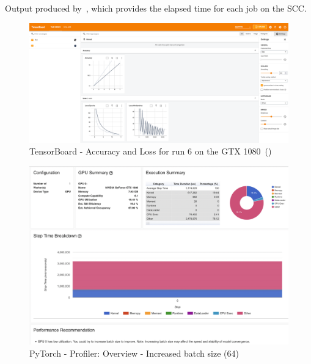 \documentclass[12pt, a4paper, hidelinks]{article}
\begin{document}

\newpage
\printbibliography[heading=bibintoc]

\appendix
\break

\renewcommand*{\thepage}{A\arabic{page}}

\begin{listing}[H]
\inputminted[xleftmargin=1em,linenos]{python}{./assets/sacct.out}
\caption[Sacct output]{Output produced by~, which provides the elapsed time for each job on the \ac{SCC}.}
\label{lst:sacct_out}
\end{listing}

\begin{figure}[H]
\centering
\includegraphics[width=1\textwidth]{./assets/scap_gtx1080_tensorboard_14615343}
\caption[TensorBoard - Accuracy and Loss]{TensorBoard - Accuracy and Loss for run 6 on the GTX 1080~()}
\label{fig:scap_gtx1080_tensorboard_14615343}
\end{figure}

\begin{figure}[H]
\centering
\includegraphics[width=1\textwidth]{./assets/scap_gtx1080_profiler-torch_batch-size-64_14650758}
\caption[PyTorch - Profiler: Overview - Increased batch size (64)]{PyTorch - Profiler: Overview - Increased batch size (64)}
\label{fig:scap_gtx1080_profiler-torch_batch-size-64_14650758}
\end{figure}
\end{document}

